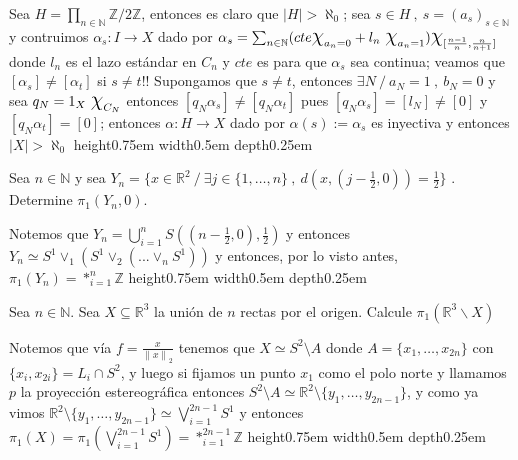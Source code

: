 \documentclass[11pt]{article}
\newcommand{\R}{{\mathbb{R}}}
\newcommand{\N}{{\mathbb{N}}}
\newcommand\norm[1]{\left\lVert#1\right\rVert}
\newenvironment{proof}[1][Demostraci\'on]{\begin{trivlist}
\item[\hskip \labelsep {\bfseries #1}]}{\end{trivlist}}
\newcommand{\qed}{\nobreak \ifvmode \relax \else
      \ifdim\lastskip<1.5em \hskip-\lastskip
      \hskip1.5em plus0em minus0.5em \fi \nobreak
      \vrule height0.75em width0.5em depth0.25em\fi}
\newcommand{\Z}{\mathbb{Z}}
\begin{document}
\begin{enumerate}
\begin{proof}

Sea $H = \prod_{n \in \N}{\Z / 2\Z}$, entonces es claro que $|H| > \aleph_0$; sea $s \in H \ , \ s=(a_s)_{s \in \N}$ y contruimos $\alpha_s :I \rightarrow X$ dado por $\alpha_s = \sum_{n \in \N} (cte \mbox{\Large$\chi$}_{a_n=0} + l_n \ \mbox{\Large$\chi$}_{a_n = 1}) \mbox{\Large$\chi$}_{[\frac{n-1}{n},\frac{n}{n+1}]}$ donde $l_n$ es el lazo est\'andar en $C_n$ y $cte$ es para que $\alpha_s$ sea continua; veamos que $[\alpha_s] \neq [\alpha_t]$ si $s \neq t$!! Supongamos que $s \neq t$, entonces $\exists N \ / \ a_N=1 \ , \ b_N=0$ y sea $q_N = 1_X \ \mbox{\Large$\chi$}_{C_N}$ entonces $[q_N \alpha_s] \neq [q_N \alpha_t]$ pues $[q_N \alpha_s]=[l_N] \neq [0]$ y $[q_N \alpha_t]=[0]$; entonces $\alpha : H \rightarrow X$ dado por $\alpha(s) := \alpha_s$ es inyectiva y entonces $|X| > \aleph_0$ \qed

\end{proof}

\item {Sea $n\in\N$ y sea $Y_n = \{ x \in \R^2 \ / \ \exists j \in \{ 1,\dots,n \} \ , \ d(x,(j- \frac{1}{2},0 ) ) = \frac{1}{2} \}$ . Determine $\pi_1(Y_n,0)$.
}

\begin{proof}

Notemos que $Y_n = \bigcup_{i=1}^{n} {S((n - \frac{1}{2},0), \frac{1}{2})}$ y entonces $Y_n \simeq S^1 \vee_{1} (S^1 \vee_2 (... \vee_n S^1))$ y entonces, por lo visto antes, $\pi_1(Y_n) = \ast_{i=1}^{n} {\Z}$ \qed

\end{proof}


\item {Sea $n\in \N$. Sea $X\subseteq  \R^3$ la uni\'on de $n$ rectas por el origen. Calcule $\pi_1( \R^3\smallsetminus X)$}

\begin{proof}

Notemos que v\'ia $f= \frac{x}{\norm{x}_2}$ tenemos que $X \simeq S^2 \setminus A$ donde $A = \{ x_1, \dots ,x_{2n} \}$ con $\{x_i , x_{2i} \} = L_i \cap S^2$, y luego si fijamos un punto $x_1$ como el polo norte y llamamos $p$ la proyecci\'on estereogr\'afica entonces $S^2 \setminus A \simeq \R^2 \setminus \{y_1, \dots , y_{2n-1} \}$, y como ya vimos $\R^2 \setminus \{y_1, \dots , y_{2n-1} \} \simeq \bigvee_{i=1}^{2n-1}{S^1}$ y entonces $\pi_1(X)=\pi_1(\bigvee_{i=1}^{2n-1}{S^1}) = \ast_{i=1}^{2n-1}{\Z}$ \qed


\end{proof}
\end{enumerate}
\end{document}
